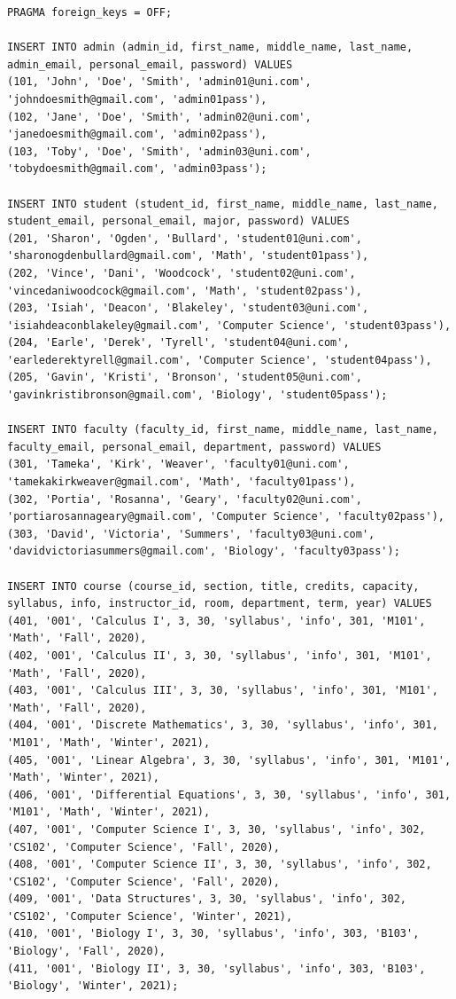 \documentclass{report}
\begin{document}
\begin{lstlisting}
PRAGMA foreign_keys = OFF;

INSERT INTO admin (admin_id, first_name, middle_name, last_name, admin_email, personal_email, password) VALUES
(101, 'John', 'Doe', 'Smith', 'admin01@uni.com', 'johndoesmith@gmail.com', 'admin01pass'),
(102, 'Jane', 'Doe', 'Smith', 'admin02@uni.com', 'janedoesmith@gmail.com', 'admin02pass'),
(103, 'Toby', 'Doe', 'Smith', 'admin03@uni.com', 'tobydoesmith@gmail.com', 'admin03pass');

INSERT INTO student (student_id, first_name, middle_name, last_name, student_email, personal_email, major, password) VALUES
(201, 'Sharon', 'Ogden', 'Bullard', 'student01@uni.com', 'sharonogdenbullard@gmail.com', 'Math', 'student01pass'),
(202, 'Vince', 'Dani', 'Woodcock', 'student02@uni.com', 'vincedaniwoodcock@gmail.com', 'Math', 'student02pass'),
(203, 'Isiah', 'Deacon', 'Blakeley', 'student03@uni.com', 'isiahdeaconblakeley@gmail.com', 'Computer Science', 'student03pass'),
(204, 'Earle', 'Derek', 'Tyrell', 'student04@uni.com', 'earlederektyrell@gmail.com', 'Computer Science', 'student04pass'),
(205, 'Gavin', 'Kristi', 'Bronson', 'student05@uni.com', 'gavinkristibronson@gmail.com', 'Biology', 'student05pass');

INSERT INTO faculty (faculty_id, first_name, middle_name, last_name, faculty_email, personal_email, department, password) VALUES
(301, 'Tameka', 'Kirk', 'Weaver', 'faculty01@uni.com', 'tamekakirkweaver@gmail.com', 'Math', 'faculty01pass'),
(302, 'Portia', 'Rosanna', 'Geary', 'faculty02@uni.com', 'portiarosannageary@gmail.com', 'Computer Science', 'faculty02pass'),
(303, 'David', 'Victoria', 'Summers', 'faculty03@uni.com', 'davidvictoriasummers@gmail.com', 'Biology', 'faculty03pass');

INSERT INTO course (course_id, section, title, credits, capacity, syllabus, info, instructor_id, room, department, term, year) VALUES
(401, '001', 'Calculus I', 3, 30, 'syllabus', 'info', 301, 'M101', 'Math', 'Fall', 2020),
(402, '001', 'Calculus II', 3, 30, 'syllabus', 'info', 301, 'M101', 'Math', 'Fall', 2020),
(403, '001', 'Calculus III', 3, 30, 'syllabus', 'info', 301, 'M101', 'Math', 'Fall', 2020),
(404, '001', 'Discrete Mathematics', 3, 30, 'syllabus', 'info', 301, 'M101', 'Math', 'Winter', 2021),
(405, '001', 'Linear Algebra', 3, 30, 'syllabus', 'info', 301, 'M101', 'Math', 'Winter', 2021),
(406, '001', 'Differential Equations', 3, 30, 'syllabus', 'info', 301, 'M101', 'Math', 'Winter', 2021),
(407, '001', 'Computer Science I', 3, 30, 'syllabus', 'info', 302, 'CS102', 'Computer Science', 'Fall', 2020),
(408, '001', 'Computer Science II', 3, 30, 'syllabus', 'info', 302, 'CS102', 'Computer Science', 'Fall', 2020),
(409, '001', 'Data Structures', 3, 30, 'syllabus', 'info', 302, 'CS102', 'Computer Science', 'Winter', 2021),
(410, '001', 'Biology I', 3, 30, 'syllabus', 'info', 303, 'B103', 'Biology', 'Fall', 2020),
(411, '001', 'Biology II', 3, 30, 'syllabus', 'info', 303, 'B103', 'Biology', 'Winter', 2021);


\end{lstlisting}
\end{document}
